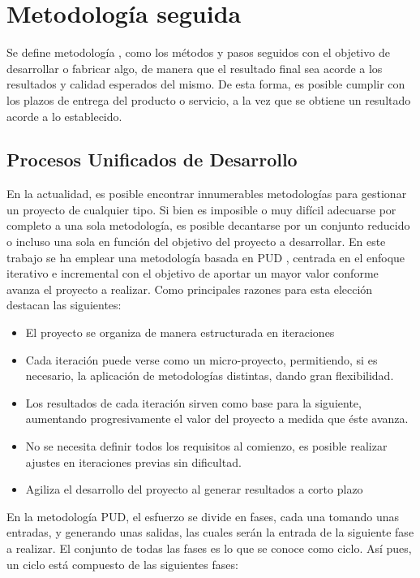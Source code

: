 \section{Metodología seguida}
Se define metodología \cite{metodologiaRAE}, como los métodos y pasos seguidos con el objetivo de desarrollar o fabricar algo, de manera que el resultado final sea acorde a los resultados y calidad esperados del mismo. De esta forma, es posible cumplir con los plazos de entrega del producto o servicio, a la vez que se obtiene un resultado acorde a lo establecido. 

\subsection{Procesos Unificados de Desarrollo}
En la actualidad, es posible encontrar innumerables metodologías para gestionar un proyecto de cualquier tipo. Si bien es imposible o muy difícil adecuarse por completo a una sola metodología, es posible decantarse por un conjunto reducido o incluso una sola en función del objetivo del proyecto a desarrollar. En este trabajo se ha emplear una metodología basada en \ac{PUD} \cite{libro-PUD} \cite{PUD-2}, centrada en el enfoque iterativo e incremental con el objetivo de aportar un mayor valor conforme avanza el proyecto a realizar. Como principales razones para esta elección destacan las siguientes:

\begin{itemize}
\item El proyecto se organiza de manera estructurada en iteraciones 
\item Cada iteración puede verse como un micro-proyecto, permitiendo, si es necesario, la aplicación de metodologías distintas, dando gran flexibilidad.
\item Los resultados de cada iteración sirven como base para la siguiente, aumentando progresivamente el valor del proyecto a medida que éste avanza.
\item No se necesita definir todos los requisitos al comienzo, es posible realizar ajustes en iteraciones previas sin dificultad.
\item Agiliza el desarrollo del proyecto al generar resultados a corto plazo
\end{itemize}

En la metodología PUD, el esfuerzo se divide en fases, cada una tomando unas entradas, y generando unas salidas, las cuales serán la entrada de la siguiente fase a realizar. El conjunto de todas las fases es lo que se conoce como ciclo. Así pues, un ciclo está compuesto de las siguientes fases:

